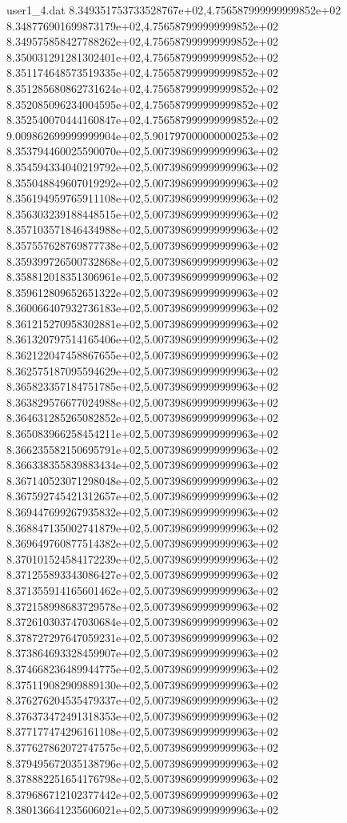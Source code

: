 \begin{filecontents}{user1_4.dat}
8.349351753733528767e+02,4.756587999999999852e+02
8.348776901699873179e+02,4.756587999999999852e+02
8.349575858427788262e+02,4.756587999999999852e+02
8.350031291281302401e+02,4.756587999999999852e+02
8.351174648573519335e+02,4.756587999999999852e+02
8.351285680862731624e+02,4.756587999999999852e+02
8.352085096234004595e+02,4.756587999999999852e+02
8.352540070444160847e+02,4.756587999999999852e+02
9.009862699999999904e+02,5.901797000000000253e+02
8.353794460025590070e+02,5.007398699999999963e+02
8.354594334040219792e+02,5.007398699999999963e+02
8.355048849607019292e+02,5.007398699999999963e+02
8.356194959765911108e+02,5.007398699999999963e+02
8.356303239188448515e+02,5.007398699999999963e+02
8.357103571846434988e+02,5.007398699999999963e+02
8.357557628769877738e+02,5.007398699999999963e+02
8.359399726500732868e+02,5.007398699999999963e+02
8.358812018351306961e+02,5.007398699999999963e+02
8.359612809652651322e+02,5.007398699999999963e+02
8.360066407932736183e+02,5.007398699999999963e+02
8.361215270958302881e+02,5.007398699999999963e+02
8.361320797514165406e+02,5.007398699999999963e+02
8.362122047458867655e+02,5.007398699999999963e+02
8.362575187095594629e+02,5.007398699999999963e+02
8.365823357184751785e+02,5.007398699999999963e+02
8.363829576677024988e+02,5.007398699999999963e+02
8.364631285265082852e+02,5.007398699999999963e+02
8.365083966258454211e+02,5.007398699999999963e+02
8.366235582150695791e+02,5.007398699999999963e+02
8.366338355839883434e+02,5.007398699999999963e+02
8.367140523071298048e+02,5.007398699999999963e+02
8.367592745421312657e+02,5.007398699999999963e+02
8.369447699267935832e+02,5.007398699999999963e+02
8.368847135002741879e+02,5.007398699999999963e+02
8.369649760877514382e+02,5.007398699999999963e+02
8.370101524584172239e+02,5.007398699999999963e+02
8.371255893343086427e+02,5.007398699999999963e+02
8.371355914165601462e+02,5.007398699999999963e+02
8.372158998683729578e+02,5.007398699999999963e+02
8.372610303747030684e+02,5.007398699999999963e+02
8.378727297647059231e+02,5.007398699999999963e+02
8.373864693328459907e+02,5.007398699999999963e+02
8.374668236489944775e+02,5.007398699999999963e+02
8.375119082909889130e+02,5.007398699999999963e+02
8.376276204535479337e+02,5.007398699999999963e+02
8.376373472491318353e+02,5.007398699999999963e+02
8.377177474296161108e+02,5.007398699999999963e+02
8.377627862072747575e+02,5.007398699999999963e+02
8.379495672035138796e+02,5.007398699999999963e+02
8.378882251654176798e+02,5.007398699999999963e+02
8.379686712102377442e+02,5.007398699999999963e+02
8.380136641235606021e+02,5.007398699999999963e+02

\end{filecontents}
